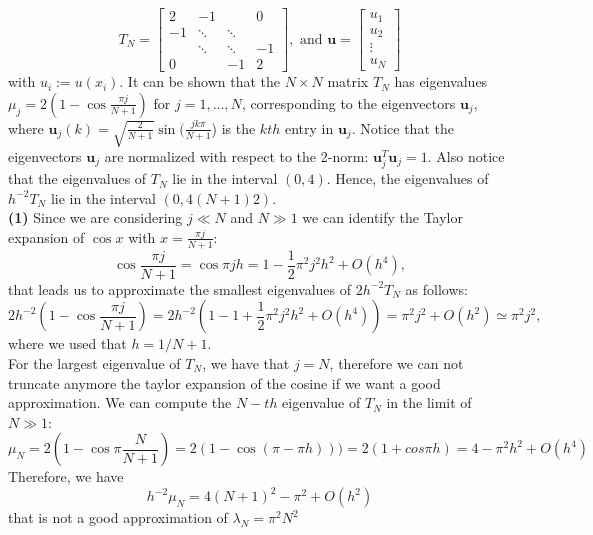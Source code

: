 \documentclass[a4paper,11pt]{article}
\begin{document}
\begin{equation}\label{key}
	T_N = \begin{bmatrix}
		2 & -1 &  & 0 \\
		-1 & \ddots  & \ddots  &  \\
		& \ddots & \ddots & -1 \\
		0 &  & -1 & 2
	\end{bmatrix}, \text{ and } \textbf{u} = \begin{bmatrix}
		u_1\\
		u_2\\
		\vdots\\
		u_N
	\end{bmatrix} 
\end{equation}
with $u_i := u(x_i)$. It can be shown that the $N \times N$ matrix $T_N$ has eigenvalues $\mu_j = 2(1- \cos \frac{\pi j }{N+1})$ for $j = 1, \dots, N$, corresponding to the eigenvectors $\textbf{u}_j$, where $\textbf{u}_j(k) = \sqrt{\frac{2}{N+1}} \sin( \frac{j k \pi}{N+1} $) is the $kth$ entry in $\textbf{u}_j$. Notice that the eigenvectors $\textbf{u}_j$ are normalized with respect to the 2-norm: $\textbf{u}^T_j \textbf{u}_j = 1$. Also notice that the eigenvalues of $T_N$ lie in the interval $(0, 4)$. Hence, the eigenvalues of $h^{-2} T_N$ lie in the interval $(0, 4(N + 1)2 )$.\\


\noindent \textbf{(1)} Since we are considering $j\ll N$ and $N\gg1$ we can identify the Taylor expansion of $\cos x$ with $x = \frac{\pi j }{N+1}$:
\begin{equation}
	\cos \frac{\pi j }{N+1} = \cos \pi j h = 1 - \frac{1}{2} \pi^2 j^2 h^2 + O(h^4),
\end{equation}
that leads us to approximate the smallest eigenvalues of $2h^{-2} T_N$ as follows:
\begin{equation}\label{key}
	2h^{-2} (1- \cos \frac{\pi j }{N+1} ) = 2h^{-2} (1- 1 + \frac{1}{2} \pi^2 j^2 h^2 + O(h^4)) = \pi^2 j^2  + O(h^2) \simeq \pi^2 j^2,
\end{equation}
where we used that $h=1/N+1$.\\
\noindent For the largest eigenvalue of $T_N$, we have that $j = N$, therefore we can not truncate anymore the taylor expansion of the cosine if we want a good approximation. We can compute the $N-th$ eigenvalue of $T_N$ in the limit of $N\gg 1$:
\begin{equation}\label{key}
	\mu_N = 2(1-\cos\pi  \frac{N}{N+1})  =2(1-\cos (\pi -\pi h) )) = 2(1+cos\pi h) = 4 - \pi^2 h^2 + O(h^4)
\end{equation}
Therefore, we have
\begin{equation}\label{key}
	h^{-2} \mu_N = 4(N+1)^2 - \pi^2 + O(h^2)
\end{equation}
that is not a good approximation of $\lambda_N = \pi^2 N^2$ 
\end{document}
